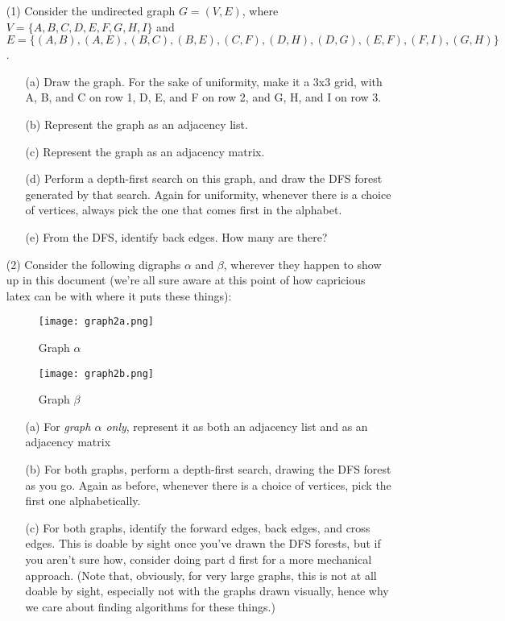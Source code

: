 \documentclass[12pt]{article}
\begin{document}
\begin{enumerate}
\item[(1)] Consider the undirected graph $G = (V,E)$, where $V = \{A,B,C,D,E,F,G,H,I\}$ and $E = \{(A,B), (A,E), (B,C), (B,E), (C,F), (D,H), (D,G), (E,F), (F,I), (G,H)\}$.
\begin{itemize}
    \item[(a)] Draw the graph. For the sake of uniformity, make it a 3x3 grid, with A, B, and C on row 1, D, E, and F on row 2, and G, H, and I on row 3.
    \item[(b)] Represent the graph as an adjacency list. 
    \item[(c)] Represent the graph as an adjacency matrix.
    \item[(d)] Perform a depth-first search on this graph, and draw the DFS forest generated by that search. Again for uniformity, whenever there is a choice of vertices, always pick the one that comes first in the alphabet.
    \item[(e)] From the DFS, identify back edges. How many are there? 
\end{itemize} 
\item[(2)] Consider the following digraphs $\alpha$ and $\beta$, wherever they happen to show up in this document (we're all sure aware at this point of how capricious latex can be with where it puts these things):
\begin{figure}[h]
    \centering
    \begin{minipage}{0.45\textwidth}
        \centering
        \texttt{[image: graph2a.png]} %
        \caption{Graph $\alpha$}
    \end{minipage}\hfill
    \begin{minipage}{0.45\textwidth}
        \centering
        \texttt{[image: graph2b.png]} %
        \caption{Graph $\beta$}
    \end{minipage}
\end{figure}
\begin{itemize}
    \item[(a)] For \emph{graph $\alpha$ only}, represent it as both an adjacency list and as an adjacency matrix 
    \item[(b)] For both graphs, perform a depth-first search, drawing the DFS forest as you go. Again as before, whenever there is a choice of vertices, pick the first one alphabetically. 
    \item[(c)] For both graphs, identify the forward edges, back edges, and cross edges. This is doable by sight once you've drawn the DFS forests, but if you aren't sure how, consider doing part d first for a more mechanical approach. (Note that, obviously, for very large graphs, this is not at all doable by sight, especially not with the graphs drawn visually, hence why we care about finding algorithms for these things.)

\end{itemize}
\end{enumerate}
\end{document}

